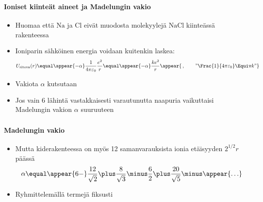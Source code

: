 \begin{frame}
\frametitle{\texorpdfstring{\culine[\sectiontitleulinecolor]{\sectiontitle}}{\sectiontitle} }
\framesubtitle{Ioniset kiinteät aineet ja Madelungin vakio}
\appear{}

\begin{itemize}
	\item Huomaa että $\mathrm{Na}$ ja $\mathrm{Cl}$ eivät muodosta molekyylejä $\mathrm{NaCl}$ kiinteässä rakenteessa 
	
	\item Ioniparin sähköinen energia voidaan kuitenkin laskea:
\[ 
 U_{\text {sitova}}(r)  \equal \appear{-\alpha} \frac{1}{4 \pi \varepsilon_{0}} \frac{e^{2}}{r}  \equal \appear{-\alpha} \frac{k e^{2}}{r} \appear{\,,\qquad \text{''} \Frac{1}{4 \pi \varepsilon_{0}} \Equiv k \text{''} } 
 \]
 

\item Vakiota $\alpha$ kutsutaan  

\item Jos vain 6 lähintä vastakkaisesti varautunutta naapuria vaikuttaisi Madelungin vakion $\alpha$ suuruuteen 

\end{itemize}

\endofslide 
\end{frame}


\begin{frame}
\frametitle{\texorpdfstring{\culine[\sectiontitleulinecolor]{\sectiontitle}}{\sectiontitle} }
\framesubtitle{Madelungin vakio}
\appear{}

\begin{itemize}
	
\item Mutta kiderakenteessa on myös 12 samanvarauksista ionia etäisyyden $2^{1 / 2} r$ päässä 
\[ 
 \alpha  \equal \appear{6-} \frac{12}{\sqrt{2}} \plus \frac{8}{\sqrt{3}}  \minus \frac{6}{2} \plus \frac{20}{\sqrt{5}}  \minus \appear{\ldots}
 \]

\item Ryhmittelemällä termejä fiksusti
\end{itemize}

\endofslide 
\end{frame}

